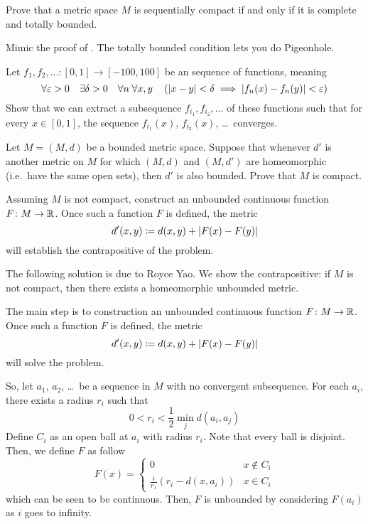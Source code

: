 \begin{dproblem}
	\gim
	Prove that a metric space $M$ is sequentially compact
	if and only if it is complete and totally bounded.
	\label{thm:bzw}
	\begin{hint}
		Mimic the proof of .
		The totally bounded condition lets you do Pigeonhole.
	\end{hint}
\end{dproblem}

\begin{problem}
	\gim
	Let
	$f_1, f_2, \ldots \colon [0,1] \to [-100,100]$
	be an  sequence of functions, meaning
	\[
		\forall \varepsilon > 0 \quad
		\exists \delta > 0 \quad
		\forall n \;
		\forall x,y \quad
		\left( \left\lvert x-y \right\rvert <\delta
		\implies \left\lvert f_n(x) - f_n(y) \right\rvert < \varepsilon \right)
	\]
	Show that we can extract a subsequence $f_{i_1}, f_{i_2}, \dots$
	of these functions such that for every $x \in [0,1]$,
	the sequence $f_{i_1}(x)$, $f_{i_2}(x)$, \dots\ converges.
\end{problem}

\begin{problem}
	\gim
	Let $M = (M,d)$ be a bounded metric space.
	Suppose that whenever $d'$ is another metric on $M$
	for which $(M,d)$ and $(M,d')$ are homeomorphic
	(i.e.\ have the same open sets), then $d'$ is also bounded.
	Prove that $M$ is compact.
	\begin{hint}
		Assuming $M$ is not compact, construct an
		unbounded continuous function $F \colon M \to \mathbb R$.
		Once such a function $F$ is defined, the metric
		\[ d'(x, y) \coloneqq d(x, y) + \left\lvert F(x) - F(y) \right\rvert \]
		will establish the contrapositive of the problem.
	\end{hint}

	\begin{sol}
		The following solution is due to Royce Yao.
		We show the contrapositive:
		if $M$ is not compact, then there exists a homeomorphic unbounded metric.

		The main step is to construction
		an unbounded continuous function $F \colon M \to \mathbb R$.
		Once such a function $F$ is defined, the metric
		\[ d'(x, y) \coloneqq d(x, y) + \left\lvert F(x) - F(y) \right\rvert \]
		will solve the problem.

		So, let $a_1$, $a_2$, \dots\ be a sequence in $M$
		with no convergent subsequence.
		For each $a_i$, there exists a radius $r_i$ such that
		\[ 0 < r_i < \frac{1}{2} \min_{j} d(a_i, a_j) \]
		Define $C_i$ as an open ball at $a_i$ with radius $r_i$.
		Note that every ball is disjoint.
		Then, we define $F$ as follow
		\[
			F(x) = \begin{cases}
				0 & x \not\in C_i \\
				\frac{i}{r_1}(r_i - d(x, a_i)) & x \in C_i
			\end{cases}
		\]
		which can be seen to be continuous.
		Then, $F$ is unbounded by considering $F(a_i)$ as $i$ goes to infinity.
	\end{sol}
\end{problem}

